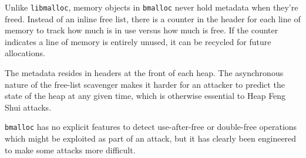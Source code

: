 Unlike \texttt{libmalloc}, memory objects in \texttt{bmalloc} never hold
metadata when they're freed. Instead of an inline free list, there is a
counter in the header for each line of memory to track how much is in
use versus how much is free. If the counter indicates a line of memory is
entirely unused, it can be recycled for future allocations.

The metadata resides in headers at the front of each heap. The
asynchronous nature of the free-list scavenger makes it harder for an attacker
to predict the state of the heap at any given time, which is otherwise
essential to Heap Feng Shui attacks.

\texttt{bmalloc} has no explicit features to detect 
use-after-free or double-free operations which might be exploited
as part of an attack, but it has clearly been engineered to make
some attacks more difficult.

